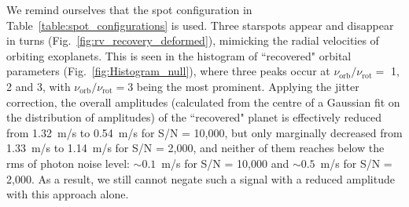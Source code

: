 We remind ourselves that the spot configuration in Table~\ref{table:spot_configurations} is used. Three starspots appear and disappear in turns (Fig.~\ref{fig:rv_recovery_deformed}), mimicking the radial velocities of orbiting exoplanets. This is seen in the histogram of ``recovered" orbital parameters (Fig.~\ref{fig:Histogram_null}), where three peaks occur at $\nu_\text{orb}/\nu_\text{rot} =$ 1, 2 and 3, with $\nu_\text{orb}/\nu_\text{rot} = 3$ being the most prominent. Applying the jitter correction, the overall amplitudes (calculated from the centre of a Gaussian fit on the distribution of amplitudes) of the ``recovered" planet is effectively reduced from 1.32~m/s to 0.54~m/s for S/N = 10,000, but only marginally decreased from 1.33~m/s to 1.14~m/s for S/N = 2,000, and neither of them reaches below the rms of photon noise level: $\sim 0.1$~m/s for S/N = 10,000 and $\sim 0.5$~m/s for S/N = 2,000. As a result, we still cannot negate such a signal with a reduced amplitude with this approach alone. 

